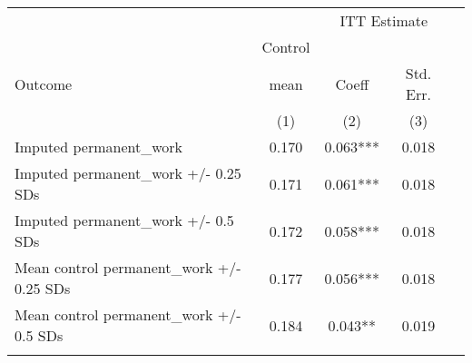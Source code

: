 \begin{tabular}{lcccc}
\hline \noalign{\smallskip} &  & \multicolumn{2}{c}{{ ITT Estimate}} & \\
\cline{3-4} & Control &  &  & \\
Outcome & mean & Coeff & Std. Err. & \\
 & (1) & (2) & (3) & \\
\noalign{\smallskip}\hline \noalign{\smallskip}Imputed permanent\_work & 0.170 & 0.063*** & 0.018 & \\
Imputed permanent\_work +/- 0.25 SDs & 0.171 & 0.061*** & 0.018 & \\
Imputed permanent\_work +/- 0.5 SDs & 0.172 & 0.058*** & 0.018 & \\
Mean control permanent\_work +/- 0.25 SDs & 0.177 & 0.056*** & 0.018 & \\
Mean control permanent\_work +/- 0.5 SDs & 0.184 & 0.043** & 0.019 & \\
\noalign{\smallskip}\hline\end{tabular}\\

